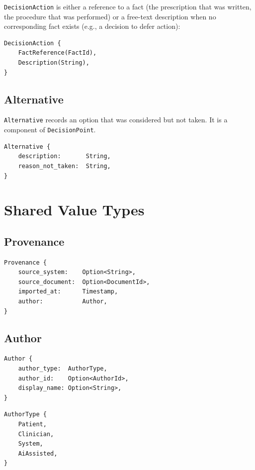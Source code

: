 \documentclass[11pt]{article}
\begin{document}
\texttt{DecisionAction} is either a reference to a fact (the prescription
that was written, the procedure that was performed) or a free-text
description when no corresponding fact exists (e.g., a decision to defer
action):

\begin{lstlisting}
DecisionAction {
    FactReference(FactId),
    Description(String),
}
\end{lstlisting}

\subsection{Alternative}

\texttt{Alternative} records an option that was considered but not taken. It
is a component of \texttt{DecisionPoint}.

\begin{lstlisting}
Alternative {
    description:       String,
    reason_not_taken:  String,
}
\end{lstlisting}

\section{Shared Value Types}
\label{sec:value-types}

\subsection{Provenance}

\begin{lstlisting}
Provenance {
    source_system:    Option<String>,
    source_document:  Option<DocumentId>,
    imported_at:      Timestamp,
    author:           Author,
}
\end{lstlisting}

\subsection{Author}

\begin{lstlisting}
Author {
    author_type:  AuthorType,
    author_id:    Option<AuthorId>,
    display_name: Option<String>,
}
\end{lstlisting}

\begin{lstlisting}
AuthorType {
    Patient,
    Clinician,
    System,
    AiAssisted,
}
\end{lstlisting}
\end{document}
